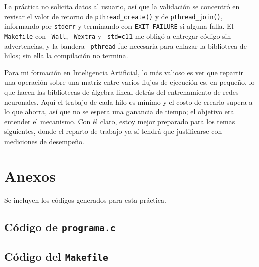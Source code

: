 La práctica no solicita datos al usuario, así que la validación se concentró en revisar el valor de retorno de \texttt{pthread\_create()} y de \texttt{pthread\_join()}, informando por \texttt{stderr} y terminando con \texttt{EXIT\_FAILURE} si alguna falla. El \texttt{Makefile} con \texttt{-Wall}, \texttt{-Wextra} y \texttt{-std=c11} me obligó a entregar código sin advertencias, y la bandera \texttt{-pthread} fue necesaria para enlazar la biblioteca de hilos; sin ella la compilación no termina.

Para mi formación en Inteligencia Artificial, lo más valioso es ver que repartir una operación sobre una matriz entre varios flujos de ejecución es, en pequeño, lo que hacen las bibliotecas de álgebra lineal detrás del entrenamiento de redes neuronales. Aquí el trabajo de cada hilo es mínimo y el costo de crearlo supera a lo que ahorra, así que no se espera una ganancia de tiempo; el objetivo era entender el mecanismo. Con él claro, estoy mejor preparado para los temas siguientes, donde el reparto de trabajo ya sí tendrá que justificarse con mediciones de desempeño.

\clearpage
\section{Anexos}
\label{sec:prac03:anexos}

Se incluyen los códigos generados para esta práctica.

\subsection{Código de \texttt{programa.c}}



\subsection{Código del \texttt{Makefile}}


